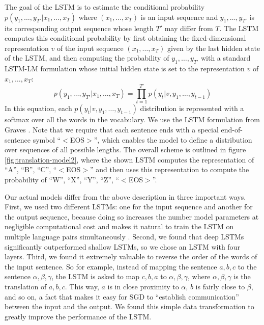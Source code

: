 The goal of the LSTM is to estimate the conditional probability
$p(y_1,\ldots,y_{T'} | x_1,\ldots,x_T)$ where $(x_1,\ldots,x_T)$ is an
input sequence and $y_1,\ldots,y_{T'}$ is its corresponding output
sequence whose length $T'$ may differ from $T$. The LSTM computes this
conditional probability by first obtaining the fixed-dimensional
representation $v$ of the input sequence $(x_1,\ldots,x_T)$ given by
the last hidden state of the LSTM, and then computing the probability
of $y_1,\ldots,y_{T'}$ with a standard LSTM-LM formulation whose
initial hidden state is set to the representation $v$ of
$x_1,\ldots,x_T$:
\begin{equation}
p(y_1,\ldots,y_{T'} | x_1,\ldots,x_T) = \prod_{t=1}^{T'} p(y_t | v, y_1, \ldots, y_{t-1})
\label{eqn:keyequation}
\end{equation}
In this equation, each $p(y_t | v, y_1, \ldots, y_{t-1})$ distribution
is represented with a softmax over all the words in the
vocabulary.  We use the LSTM formulation from Graves \cite{graves13c}.
Note that we require that each sentence ends with a special
end-of-sentence symbol ``$<$EOS$>$'', which enables the model to define a
distribution over sequences of all possible lengths. The overall
scheme is outlined in figure \ref{fig:translation-model2}, where the
shown LSTM computes the representation of ``A'', ``B'', ``C'', ``$<$EOS$>$''
and then uses this representation to compute the probability of ``W'',
``X'', ``Y'', ``Z'', ``$<$EOS$>$''.

Our actual models differ from the above description in three important
ways.  First, we used two different LSTMs: one for the input sequence
and another for the output sequence, because doing so increases the
number model parameters at negligible computational cost and makes it
natural to train the LSTM on multiple language pairs simultaneously
\cite{kal13}.  Second, we found that deep LSTMs significantly
outperformed shallow LSTMs, so we chose an LSTM with four layers.
Third, we found it extremely valuable to reverse the order of the
words of the input sentence. So for example, instead of mapping the
sentence $a,b,c$ to the sentence $\alpha, \beta, \gamma$, the LSTM is
asked to map $c,b,a$ to $\alpha, \beta, \gamma$, where $\alpha, \beta,
\gamma$ is the translation of $a,b,c$.  This way, $a$ is in close
proximity to $\alpha$, $b$ is fairly close to $\beta$, and so on, a
fact that makes it easy for SGD to ``establish communication'' between
the input and the output.  We found this simple data transformation to
greatly improve the performance of the LSTM.



